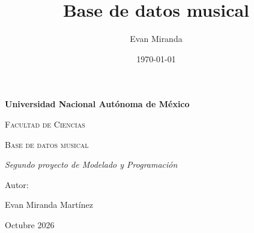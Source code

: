 \documentclass{article}
\title{Base de datos musical}
\author{Evan Miranda}
\date{\today}
\begin{document}
\begin{titlepage}
	\centering
	{\bfseries\LARGE Universidad Nacional Autónoma de México \par}
	\vspace{1cm}
	{\scshape\Large Facultad de Ciencias \par}
	\vspace{3cm}
	{\scshape\Huge Base de datos musical \par}
	\vspace{3cm}
	{\itshape\Large Segundo proyecto de Modelado y Programación \par}
	\vfill
	{\Large Autor: \par}
	{\Large Evan Miranda Martínez \par}
	\vfill
	{\Large Octubre 2026 \par}
\end{titlepage}







\nocite{*}
\printbibliography
\end{document}
